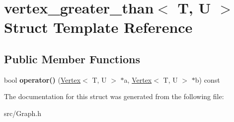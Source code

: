 \hypertarget{structvertex__greater__than}{}\section{vertex\+\_\+greater\+\_\+than$<$ T, U $>$ Struct Template Reference}
\label{structvertex__greater__than}
\subsection*{Public Member Functions}
\begin{DoxyCompactItemize}
\item 
bool {\bfseries operator()} (\hyperlink{class_vertex}{Vertex}$<$ T, U $>$ $\ast$a, \hyperlink{class_vertex}{Vertex}$<$ T, U $>$ $\ast$b) const \hypertarget{structvertex__greater__than_aea292fe1f275758baa4944809e9ab43c}{}\label{structvertex__greater__than_aea292fe1f275758baa4944809e9ab43c}

\end{DoxyCompactItemize}


The documentation for this struct was generated from the following file\+:\begin{DoxyCompactItemize}
\item 
src/Graph.\+h\end{DoxyCompactItemize}
